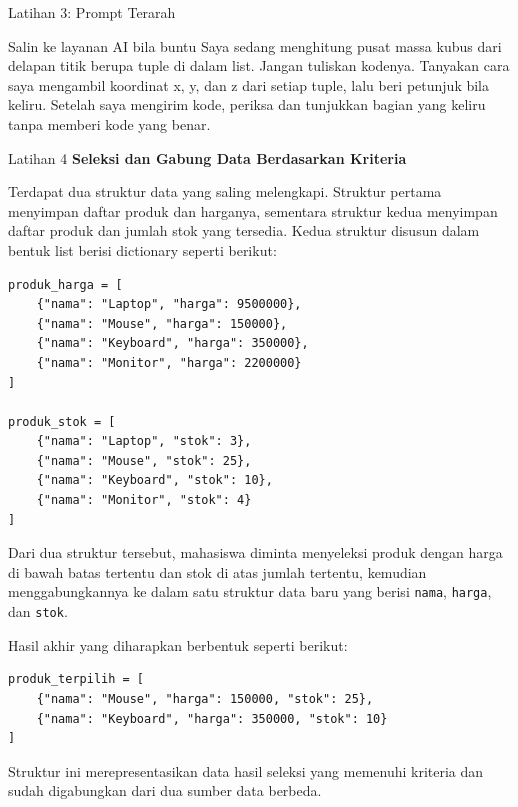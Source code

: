 \documentclass[aspectratio=169, table]{beamer}
\begin{document}
\begin{frame}{Latihan 3: Prompt Terarah}
\begin{block}{Salin ke layanan AI bila buntu}
\small Saya sedang menghitung pusat massa kubus dari delapan titik berupa tuple di dalam list. Jangan tuliskan kodenya. Tanyakan cara saya mengambil koordinat x, y, dan z dari setiap tuple, lalu beri petunjuk bila keliru. Setelah saya mengirim kode, periksa dan tunjukkan bagian yang keliru tanpa memberi kode yang benar.
\end{block}
\end{frame}

\begin{frame}[fragile,allowframebreaks=0.8]{Latihan 4}
\footnotesize
\textbf{Seleksi dan Gabung Data Berdasarkan Kriteria}\par\medskip
Terdapat dua struktur data yang saling melengkapi. 
Struktur pertama menyimpan daftar produk dan harganya, 
sementara struktur kedua menyimpan daftar produk dan jumlah stok yang tersedia. 
Kedua struktur disusun dalam bentuk list berisi dictionary seperti berikut:

\begin{lstlisting}[style=PythonStyle, breaklines=true]
produk_harga = [
    {"nama": "Laptop", "harga": 9500000},
    {"nama": "Mouse", "harga": 150000},
    {"nama": "Keyboard", "harga": 350000},
    {"nama": "Monitor", "harga": 2200000}
]

produk_stok = [
    {"nama": "Laptop", "stok": 3},
    {"nama": "Mouse", "stok": 25},
    {"nama": "Keyboard", "stok": 10},
    {"nama": "Monitor", "stok": 4}
]
\end{lstlisting}

Dari dua struktur tersebut, mahasiswa diminta menyeleksi produk 
dengan harga di bawah batas tertentu dan stok di atas jumlah tertentu, 
kemudian menggabungkannya ke dalam satu struktur data baru yang berisi 
\texttt{nama}, \texttt{harga}, dan \texttt{stok}. 

Hasil akhir yang diharapkan berbentuk seperti berikut:

\begin{lstlisting}[style=PythonStyle, breaklines=true]
produk_terpilih = [
    {"nama": "Mouse", "harga": 150000, "stok": 25},
    {"nama": "Keyboard", "harga": 350000, "stok": 10}
]
\end{lstlisting}

Struktur ini merepresentasikan data hasil seleksi yang memenuhi kriteria dan sudah digabungkan dari dua sumber data berbeda.
\end{frame}
\end{document}
